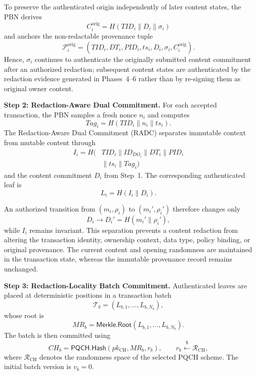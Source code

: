 \documentclass[lettersize,journal]{IEEEtran}
\begin{document}
To preserve the authenticated origin independently of later content
states, the PBN derives
\begin{equation}
C_i^{\mathrm{orig}}
=
H(TID_i\parallel D_i\parallel\sigma_i)
\end{equation}
and anchors the non-redactable provenance tuple
\begin{equation}
\mathcal{P}_i^{\mathrm{orig}}
=
(TID_i,DT_i,PID_i,ts_i,D_i,\sigma_i,C_i^{\mathrm{orig}}).
\end{equation}
Hence, $\sigma_i$ continues to authenticate the originally submitted
content commitment after an authorized redaction; subsequent content
states are authenticated by the redaction evidence generated in
Phases~4--6 rather than by re-signing them as original owner content.

\medskip
\noindent\textbf{Step 2: Redaction-Aware Dual Commitment.}
For each accepted transaction, the PBN samples a fresh nonce $n_i$ and
computes
\begin{equation}
Tag_i=H(TID_i\parallel n_i\parallel ts_i).
\end{equation}
The Redaction-Aware Dual Commitment (RADC) separates immutable context
from mutable content through
\begin{equation}
\begin{aligned}
I_i=H(&TID_i\parallel ID_{DO_i}\parallel DT_i
\parallel PID_i\\
&\parallel ts_i\parallel Tag_i)
\end{aligned}
\end{equation}
and the content commitment $D_i$ from Step~1. The corresponding
authenticated leaf is
\begin{equation}
L_i=H(I_i\parallel D_i).
\end{equation}

An authorized transition from $(m_i,\rho_i)$ to
$(m_i',\rho_i')$ therefore changes only
\begin{equation}
D_i\rightarrow D_i'=H(m_i'\parallel\rho_i'),
\end{equation}
while $I_i$ remains invariant. This separation prevents a content
redaction from altering the transaction identity, ownership context,
data type, policy binding, or original provenance. The current content
and opening randomness are maintained in the transaction state, whereas
the immutable provenance record remains unchanged.

\medskip
\noindent\textbf{Step 3: Redaction-Locality Batch Commitment.}
Authenticated leaves are placed at deterministic positions in a
transaction batch
\begin{equation}
\mathcal{T}_b=(L_{b,1},\ldots,L_{b,N_b}),
\end{equation}
whose root is
\begin{equation}
MR_b=
\mathsf{Merkle.Root}(L_{b,1},\ldots,L_{b,N_b}).
\end{equation}
The batch is then committed using
\begin{equation}
CH_b=
\mathsf{PQCH.Hash}(pk_{\mathrm{CH}},MR_b,r_b),
\qquad
r_b\stackrel{\$}{\leftarrow}\mathcal{R}_{\mathrm{CH}},
\end{equation}
where $\mathcal{R}_{\mathrm{CH}}$ denotes the randomness space of the
selected PQCH scheme. The initial batch version is $v_b=0$.
\end{document}
